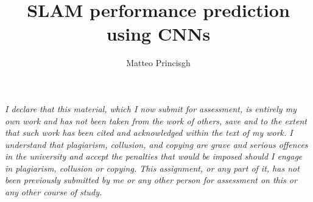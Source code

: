 \documentclass{article}
\title{\textbf{SLAM performance prediction using CNNs}}
\begin{document}
\author{Matteo Princisgh}
\date{}
\maketitle

\begin{center}
\parbox{0.85\textwidth}{
\centering\textit{
I declare that this material, which I now submit for assessment, is entirely my own work and has not been taken from the work of others, save and to the extent that such work has been cited and acknowledged within the text of my work. I understand that plagiarism, collusion, and copying are grave and serious offences in the university and accept the penalties that would be imposed should I engage in plagiarism, collusion or copying. This assignment, or any part of it, has not been previously submitted by me or any other person for assessment on this or any other course of study.}}
\end{center}









\newpage


\end{document}
